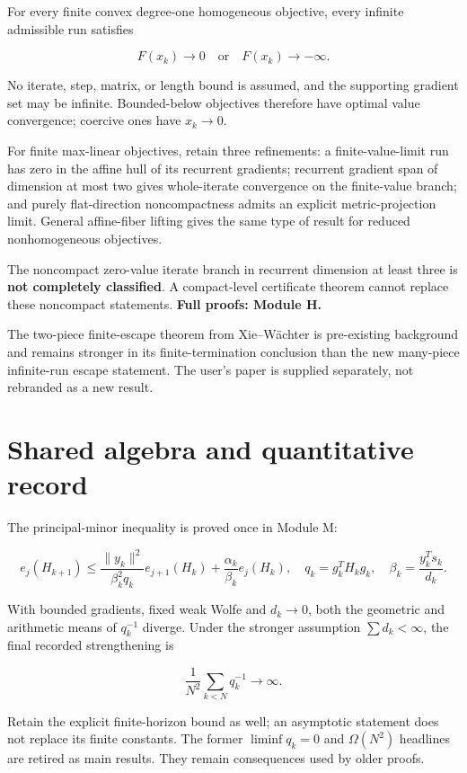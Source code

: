 \documentclass[10pt,oneside,openany]{book}
\theoremstyle{remark}\newtheorem{remark}{Remark}[chapter]
\begin{document}
For every finite convex degree-one homogeneous objective, every infinite admissible run satisfies

\[F(x_k)\to0\quad\text{or}\quad F(x_k)\to-\infty.\]

No iterate, step, matrix, or length bound is assumed, and the supporting gradient set may be infinite. Bounded-below objectives therefore have optimal value convergence; coercive ones have \(x_k\to0\).

For finite max-linear objectives, retain three refinements: a finite-value-limit run has zero in the affine hull of its recurrent gradients; recurrent gradient span of dimension at most two gives whole-iterate convergence on the finite-value branch; and purely flat-direction noncompactness admits an explicit metric-projection limit. General affine-fiber lifting gives the same type of result for reduced nonhomogeneous objectives.

The noncompact zero-value iterate branch in recurrent dimension at least three is \textbf{not completely classified}. A compact-level certificate theorem cannot replace these noncompact statements. \textbf{Full proofs: Module H.}

The two-piece finite-escape theorem from Xie--Wächter is pre-existing background and remains stronger in its finite-termination conclusion than the new many-piece infinite-run escape statement. The user's paper is supplied separately, not rebranded as a new result.

\section{Shared algebra and quantitative record}\label{shared-algebra-and-quantitative-record}

The principal-minor inequality is proved once in Module M:

\[e_j(H_{k+1})\le
\frac{\|y_k\|^2}{\beta_k^2q_k}e_{j+1}(H_k)
+\frac{\alpha_k}{\beta_k}e_j(H_k),\quad
q_k=g_k^TH_kg_k,\quad\beta_k=\frac{y_k^Ts_k}{d_k}.\]

With bounded gradients, fixed weak Wolfe and \(d_k\to0\), both the geometric and arithmetic means of \(q_k^{-1}\) diverge. Under the stronger assumption \(\sum d_k<\infty\), the final recorded strengthening is

\[\boxed{\frac1{N^2}\sum_{k<N}q_k^{-1}\to\infty.}\]

Retain the explicit finite-horizon bound as well; an asymptotic statement does not replace its finite constants. The former \(\liminf q_k=0\) and \(\Omega(N^2)\) headlines are retired as main results. They remain consequences used by older proofs.
\end{document}
